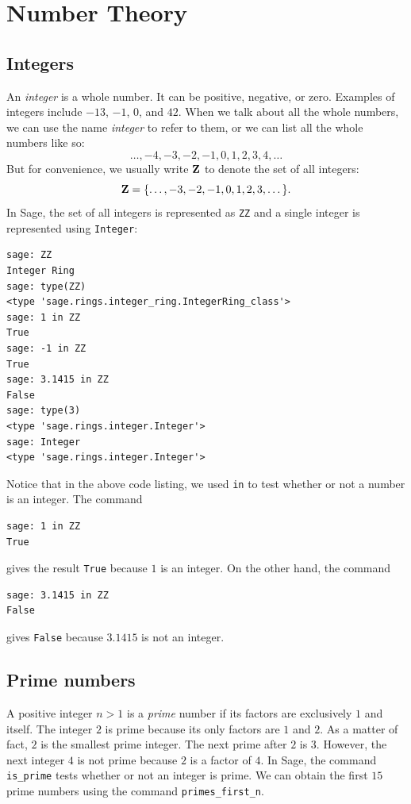 
\chapter{Number Theory}



\section{Integers}

An \emph{integer} is a whole number. It can be positive, negative, or
zero. Examples of integers include $-13$, $-1$, $0$, and $42$. When we
talk about all the whole numbers, we can use the name \emph{integer}
to refer to them, or we can list all the whole numbers like so:
\[
\dots, -4, -3, -2, -1, 0, 1, 2, 3, 4, \dots
\]
But for convenience, we usually write $\mathbf{Z}$ to denote the set of all
integers:
\[
\mathbf{Z}
=
\{\dots, -3, -2, -1, 0, 1, 2, 3, \dots\}.
\]
In Sage, the set of all integers is represented as \verb!ZZ! and a
single integer is represented using \verb!Integer!:
%
\begin{lstlisting}
sage: ZZ
Integer Ring
sage: type(ZZ)
<type 'sage.rings.integer_ring.IntegerRing_class'>
sage: 1 in ZZ
True
sage: -1 in ZZ
True
sage: 3.1415 in ZZ
False
sage: type(3)
<type 'sage.rings.integer.Integer'>
sage: Integer
<type 'sage.rings.integer.Integer'>
\end{lstlisting}
%
Notice that in the above code listing, we used \verb!in! to test
whether or not a number is an integer. The command
%
\begin{lstlisting}
sage: 1 in ZZ
True
\end{lstlisting}
%
gives the result \verb!True! because $1$ is an integer. On the other
hand, the command
%
\begin{lstlisting}
sage: 3.1415 in ZZ
False
\end{lstlisting}
%
gives \verb!False! because $3.1415$ is not an integer.



\section{Prime numbers}

A positive integer $n > 1$ is a \emph{prime} number if its factors are
exclusively $1$ and itself. The integer $2$ is prime because its only
factors are $1$ and $2$. As a matter of fact, $2$ is the smallest
prime integer. The next prime after $2$ is $3$. However, the next
integer $4$ is not prime because $2$ is a factor of $4$. In Sage, the
command \verb!is_prime! tests whether or not an integer is prime. We
can obtain the first $15$ prime numbers using the command
\verb!primes_first_n!.

